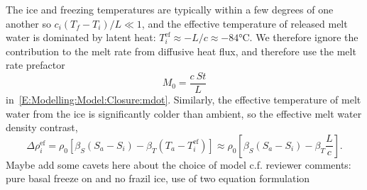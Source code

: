 \documentclass{jfm}
\newcommand{\red}[1]{{\color{red} #1}}
\begin{document}
The ice and freezing temperatures are typically within a few degrees of one another so $c_i(T_f - T_i)/ L \ll 1$, and the effective temperature of released melt water is dominated by latent heat: $T_i^{\text{ef}} \approx -L/c \approx -84\si{\celsius}$. We therefore ignore the contribution to the melt rate from diffusive heat flux, and therefore use the melt rate prefactor
\begin{equation}\label{E:Modelling:Model:Closure:M0_simple}
 M_0 = \frac{c~\mathit{St}}{L}
\end{equation}
in~\eqref{E:Modelling:Model:Closure:mdot}. Similarly, the effective temperature of melt water from the ice is significantly colder than ambient, so the effective melt water density contrast,
\begin{equation}\label{E:Modelling:Model:EffectiveDensity}
\Delta \rho_i^{\text{ef}} = \rho_0 \left[\beta_S(S_a - S_i) - \beta_T(T_a - T_i^{\text{ef}})\right]  \approx \rho_0 \left[\beta_S(S_a - S_i) - \beta_T\frac{L}{c}\right].
\end{equation}
\red{Maybe add some cavets here about the choice of model c.f. reviewer comments: pure basal freeze on and no frazil ice, use of two equation formulation}
\end{document}
